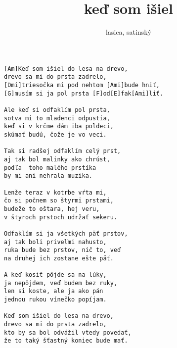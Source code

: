 \author{lasica, satinský}
\title{keď som išiel}
\maketitle
\begin{verbatim}
[Am]Keď som išiel do lesa na drevo,
drevo sa mi do prsta zadrelo,
[Dmi]triesočka mi pod nehtom [Ami]bude hniť,
[G]musím si ja pol prsta [F]od[E]fak[Ami]liť.

Ale keď si odfaklím pol prsta,
sotva mi to mladenci odpustia,
keď si v krčme dám iba poldeci,
skúmať budú, čože je vo veci.

Tak si radšej odfaklím celý prst,
aj tak bol malinky ako chrúst,
podľa  toho malého prstíka
by mi ani nehrala muzika.

Lenže teraz v kotrbe vŕta mi,
čo si počnem so štyrmi prstami,
budeže to oštara, hej veru,
v štyroch prstoch udržať sekeru.

Odfaklím si ja všetkých päť prstov,
aj tak boli priveľmi nahusto,
ruka bude bez prstov, nič to, veď
na druhej ich zostane ešte päť.

A keď kosiť pôjde sa na lúky,
ja nepôjdem, veď budem bez ruky,
len si koste, ale ja ako pán
jednou rukou vínečko popíjam.

Keď som išiel do lesa na drevo,
drevo sa mi do prsta zadrelo,
kto by sa bol odvážil vtedy povedať,
že to taký šťastný koniec bude mať. 
\end{verbatim}